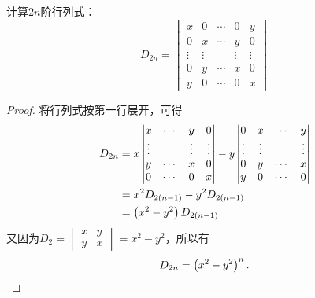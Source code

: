 \begin{problem}
计算\(2n\)阶行列式：
\begin{equation*}
    D_{2n}=
    \begin{vmatrix}
        x      & 0      & \cdots & 0      & y      \\
        0      & x      & \cdots & y      & 0      \\
        \vdots & \vdots &        & \vdots & \vdots \\
        0      & y      & \cdots & x      & 0      \\
        y      & 0      & \cdots & 0      & x
    \end{vmatrix}
\end{equation*}
\end{problem}
\begin{proof}
    将行列式按第一行展开，可得
    \begin{align*}
        D_{2n} & =x
        \begin{vmatrix}
            x      & \cdots & y      & 0      \\
            \vdots &        & \vdots & \vdots \\
            y      & \cdots & x      & 0      \\
            0      & \cdots & 0      & x
        \end{vmatrix}-y
        \begin{vmatrix}
            0      & x      & \cdots & y      \\
            \vdots & \vdots &        & \vdots \\
            0      & y      & \cdots & x      \\
            y      & 0      & \cdots & 0
        \end{vmatrix}     \\
               & =x^2D_{2(n-1)}-y^2D_{2(n-1)} \\
               & =\left( x^2-y^2 \right)D_{2(n-1)}.
    \end{align*}
    又因为\(D_2=\begin{vmatrix}x&y\\y&x\end{vmatrix}=x^2-y^2\)，所以有
    \begin{equation*}
        D_{2n}=\left( x^2-y^2 \right)^{n}.
    \end{equation*}
\end{proof}

